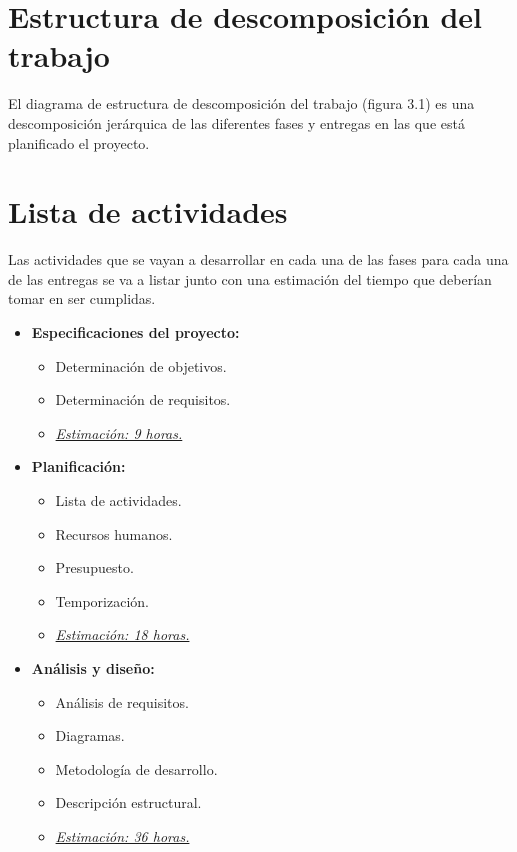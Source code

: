 \section{Estructura de descomposición del trabajo}

El diagrama de estructura de descomposición del trabajo (figura 3.1) es una descomposición jerárquica de las diferentes fases y entregas en las que está planificado el proyecto.

\newpage
\section{Lista de actividades}

Las actividades que se vayan a desarrollar en cada una de las fases para cada una de las entregas se va a listar junto con una estimación del tiempo que deberían tomar en ser cumplidas.

\begin{itemize}
   \item \textbf{Especificaciones del proyecto:}
   \begin{itemize}
    \item Determinación de objetivos.
    \item Determinación de requisitos.
    \item \underline{\textit{Estimación: 9 horas.}}
    \end{itemize}
\end{itemize}

\begin{itemize}
   \item \textbf{Planificación:}
   \begin{itemize}
    \item Lista de actividades.
    \item Recursos humanos.
    \item Presupuesto.
    \item Temporización.
    \item \underline{\textit{Estimación: 18 horas.}}
   \end{itemize}
\end{itemize}

\begin{itemize}
   \item \textbf{Análisis y diseño:}
   \begin{itemize}
    \item Análisis de requisitos.
    \item Diagramas.
    \item Metodología de desarrollo.
    \item Descripción estructural.
    \item \underline{\textit{Estimación: 36 horas.}}
   \end{itemize}
\end{itemize}

